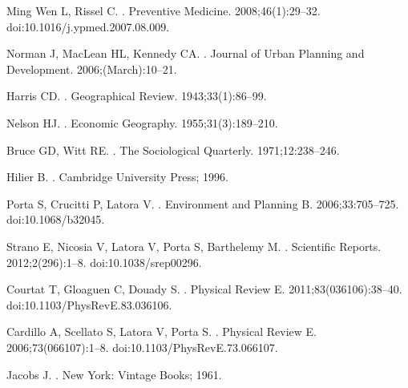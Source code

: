 {Ming Wen} L, Rissel C.
.
\newblock Preventive Medicine. 2008;46(1):29--32.
\newblock doi:{10.1016/j.ypmed.2007.08.009}.

Norman J, MacLean HL, Kennedy CA.
.
\newblock Journal of Urban Planning and Development. 2006;(March):10--21.

Harris CD.
.
\newblock Geographical Review. 1943;33(1):86--99.

Nelson HJ.
.
\newblock Economic Geography. 1955;31(3):189--210.

Bruce GD, Witt RE.
.
\newblock The Sociological Quarterly. 1971;12:238--246.

Hilier B.
.
\newblock Cambridge University Press; 1996.

Porta S, Crucitti P, Latora V.
.
\newblock Environment and Planning B. 2006;33:705--725.
\newblock doi:{10.1068/b32045}.

Strano E, Nicosia V, Latora V, Porta S, Barthelemy M.
.
\newblock Scientific Reports. 2012;2(296):1--8.
\newblock doi:{10.1038/srep00296}.

Courtat T, Gloaguen C, Douady S.
.
\newblock Physical Review E. 2011;83(036106):38--40.
\newblock doi:{10.1103/PhysRevE.83.036106}.

Cardillo A, Scellato S, Latora V, Porta S.
.
\newblock Physical Review E. 2006;73(066107):1--8.
\newblock doi:{10.1103/PhysRevE.73.066107}.

Jacobs J.
.
\newblock New York: Vintage Books; 1961.

